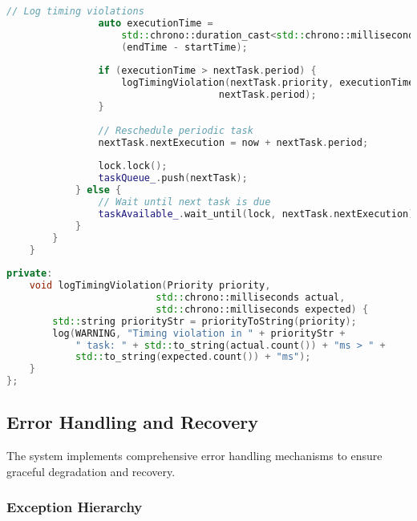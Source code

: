 \begin{lstlisting}[language=C++, caption=Real-time Task Scheduler]
                // Log timing violations
                auto executionTime = 
                    std::chrono::duration_cast<std::chrono::milliseconds>
                    (endTime - startTime);
                
                if (executionTime > nextTask.period) {
                    logTimingViolation(nextTask.priority, executionTime, 
                                     nextTask.period);
                }
                
                // Reschedule periodic task
                nextTask.nextExecution = now + nextTask.period;
                
                lock.lock();
                taskQueue_.push(nextTask);
            } else {
                // Wait until next task is due
                taskAvailable_.wait_until(lock, nextTask.nextExecution);
            }
        }
    }
    
private:
    void logTimingViolation(Priority priority, 
                          std::chrono::milliseconds actual,
                          std::chrono::milliseconds expected) {
        std::string priorityStr = priorityToString(priority);
        log(WARNING, "Timing violation in " + priorityStr + 
            " task: " + std::to_string(actual.count()) + "ms > " + 
            std::to_string(expected.count()) + "ms");
    }
};
\end{lstlisting}

\subsection{Error Handling and Recovery}
\label{subsec:error_handling}

The system implements comprehensive error handling mechanisms to ensure graceful degradation and recovery.

\subsubsection{Exception Hierarchy}

